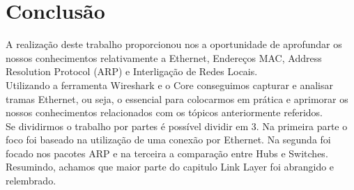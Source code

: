 \documentclass[a4paper]{report}
\begin{document}
\chapter{Conclusão}
A realização deste trabalho proporcionou nos a oportunidade de aprofundar os
nossos conhecimentos relativamente a Ethernet, Endereços MAC, Address Resolution
Protocol (ARP) e Interligação de Redes Locais.\\
Utilizando a ferramenta Wireshark e o Core conseguimos capturar e analisar
tramas Ethernet, ou seja, o essencial para colocarmos em prática e aprimorar os
nossos conhecimentos relacionados com os tópicos anteriormente referidos.\\
Se dividirmos o trabalho por partes é possível dividir em 3. Na primeira parte o
foco foi baseado na utilização de uma conexão por Ethernet. Na segunda foi
focado nos pacotes ARP e na terceira a comparação entre Hubs e Switches.
Resumindo, achamos que maior parte do capitulo Link Layer foi abrangido e
relembrado.
\end{document}
